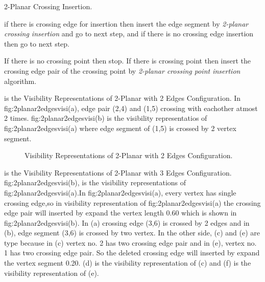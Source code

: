 \begin{algorithm}[H] 
\caption{{2-Planar Crossing Insertion}.}
\label{2pcpi}
\begin{algorithmic}[1]

\STATE if there is crossing edge for insertion then insert the edge segment by \emph{2-planar crossing insertion} and go to next step, and if there is no crossing edge insertion then go to next step.

\STATE If there is no crossing point then stop. If there is crossing point then insert the crossing edge pair of the crossing point by \emph{ 2-planar crossing point insertion} algorithm.


\end{algorithmic}
\end{algorithm}





 is the Visibility Representations of 2-Planar with 2 Edges Configuration. In {fig:2planar2edgesvisi}(a), edge pair (2,4) and (1,5) crossing with eachother atmost 2 times. {fig:2planar2edgesvisi}(b) is the visibility representatios of {fig:2planar2edgesvisi}(a) where edge segment of (1,5) is crossed by 2 vertex segment.

\begin{figure}[!tb]
\centering
\resizebox{70mm}{!}{}
\caption{Visibility Representations of 2-Planar with 2 Edges Configuration.}
\label{fig:2planar2edgesvisi}
\end{figure}



\label{2p3ev}

 is the Visibility Representations of 2-Planar with 3 Edges Configuration.  {fig:2planar2edgesvisi}(b), is the visibility representations of {fig:2planar2edgesvisi}(a).In {fig:2planar2edgesvisi}(a), every vertex has single crossing edge,so in visibility representation of {fig:2planar2edgesvisi}(a) the crossing edge pair will inserted by expand the vertex length 0.60 which is shown in {fig:2planar2edgesvisi}(b). In (a) crossing edge (3,6) is crossed by 2 edges and in (b), edge segment (3,6) is crossed by two vertex.  In the other side, (c) and (e) are type because in (c) vertex no. 2 has two crossing edge pair and in (e), vertex no. 1 has two crossing edge pair. So the deleted crossing edge will inserted by expand the vertex segment 0.20. (d) is the visibility representation of (c) and (f) is the visibility representation of (e).




